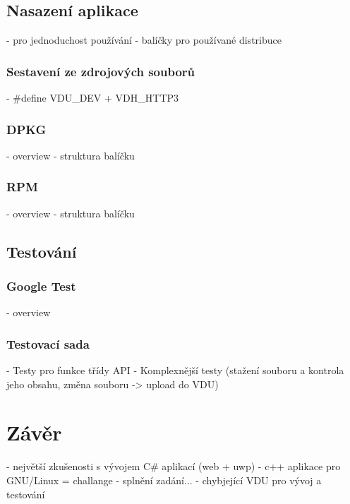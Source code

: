 \section{Nasazení aplikace}

- pro jednoduchost používání - balíčky pro používané distribuce

\subsection{Sestavení ze zdrojových souborů}

- \#define VDU\_DEV + VDH\_HTTP3

\subsection{DPKG} %

- overview
- struktura balíčku

\subsection{RPM} %

- overview
- struktura balíčku
\section{Testování}
\subsection{Google Test}

- overview

\subsection{Testovací sada}
- Testy pro funkce třídy API
- Komplexnější testy (stažení souboru a kontrola jeho obsahu, změna souboru -> upload do VDU)


\chapter{Závěr}

- největší zkušenosti s vývojem C\# aplikací (web + uwp)
- c++ aplikace pro GNU/Linux = challange
- splnění zadání...
- chybjející VDU pro vývoj a testování
